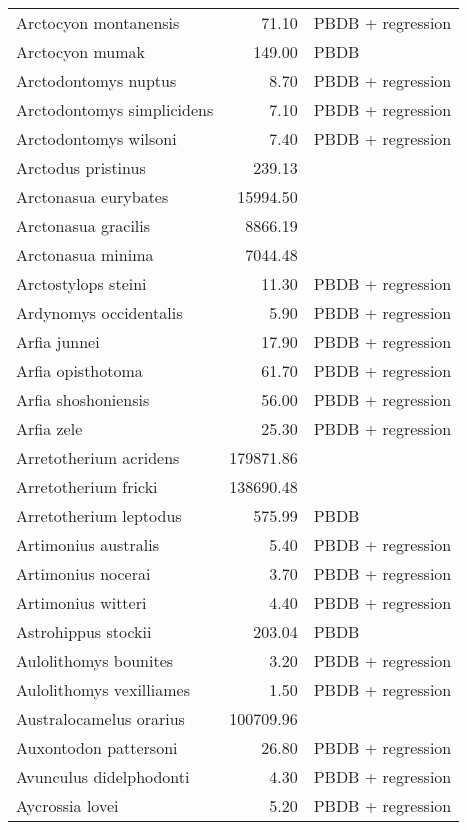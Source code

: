 \begin{table}[ht]
\begin{tabular}{lrl}
  Arctocyon montanensis & 71.10 & PBDB + regression \\ 
  Arctocyon mumak & 149.00 & PBDB \\ 
  Arctodontomys nuptus & 8.70 & PBDB + regression \\ 
  Arctodontomys simplicidens & 7.10 & PBDB + regression \\ 
  Arctodontomys wilsoni & 7.40 & PBDB + regression \\ 
  Arctodus pristinus & 239.13 & \cite{Smith2004} \\ 
  Arctonasua eurybates & 15994.50 & \cite{Tomiya2013} \\ 
  Arctonasua gracilis & 8866.19 & \cite{Tomiya2013} \\ 
  Arctonasua minima & 7044.48 & \cite{Tomiya2013} \\ 
  Arctostylops steini & 11.30 & PBDB + regression \\ 
  Ardynomys occidentalis & 5.90 & PBDB + regression \\ 
  Arfia junnei & 17.90 & PBDB + regression \\ 
  Arfia opisthotoma & 61.70 & PBDB + regression \\ 
  Arfia shoshoniensis & 56.00 & PBDB + regression \\ 
  Arfia zele & 25.30 & PBDB + regression \\ 
  Arretotherium acridens & 179871.86 & \cite{Tomiya2013} \\ 
  Arretotherium fricki & 138690.48 & \cite{Tomiya2013} \\ 
  Arretotherium leptodus & 575.99 & PBDB \\ 
  Artimonius australis & 5.40 & PBDB + regression \\ 
  Artimonius nocerai & 3.70 & PBDB + regression \\ 
  Artimonius witteri & 4.40 & PBDB + regression \\ 
  Astrohippus stockii & 203.04 & PBDB \\ 
  Aulolithomys bounites & 3.20 & PBDB + regression \\ 
  Aulolithomys vexilliames & 1.50 & PBDB + regression \\ 
  Australocamelus orarius & 100709.96 & \cite{Tomiya2013} \\ 
  Auxontodon pattersoni & 26.80 & PBDB + regression \\ 
  Avunculus didelphodonti & 4.30 & PBDB + regression \\ 
  Aycrossia lovei & 5.20 & PBDB + regression \\ 

\end{tabular}
\end{table}
